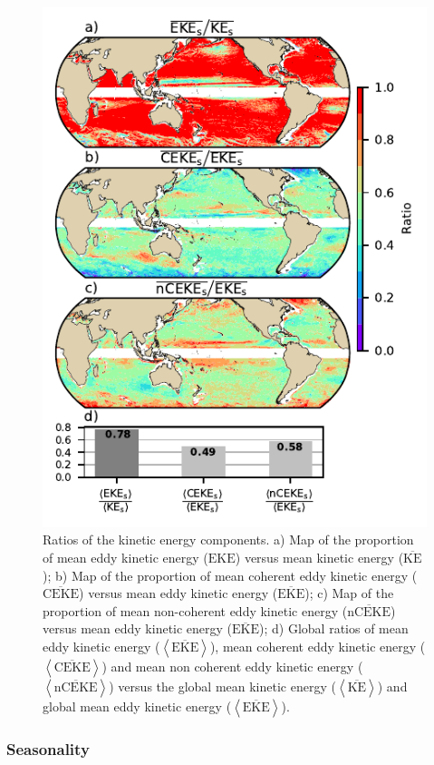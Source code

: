 \documentclass[draft,linenumbers]{agujournal2019}
\newcommand{\MKE}{\overline{\textrm{KE}}}
\newcommand{\MEKE}{\overline{\textrm{EKE}}}
\newcommand{\EKE}{\textrm{EKE}}
\newcommand{\MCEKE}{\overline{\textrm{CEKE}}}
\newcommand{\MnCEKE}{\overline{\textrm{nCEKE}}}
\begin{document}
	\begin{figure}
	    \centering
	    \includegraphics[width=1\textwidth]{figures/eke_ratio_map_easy.pdf}
	    \caption{Ratios of the kinetic energy components. a) Map of the proportion of mean eddy kinetic energy ($\EKE$) versus mean kinetic energy ($\MKE$);
		b) Map of the proportion of mean coherent eddy kinetic energy ($\MCEKE$) versus mean eddy kinetic energy ($\MEKE$);
		c) Map of the proportion of mean non-coherent eddy kinetic energy ($\MnCEKE$) versus mean eddy kinetic energy ($\MEKE$);
		d) Global ratios of mean eddy kinetic energy ($\left<\MEKE\right>$), mean coherent eddy kinetic energy ($\left<\MCEKE\right>$) and mean non coherent eddy kinetic energy ($\left<\MnCEKE\right>$) versus the global mean kinetic energy ($\left<\MKE\right>$) and global mean eddy kinetic energy ($\left<\MEKE\right>$).
		}
	    \label{fig:eddy_ratio}
	\end{figure}

	\subsubsection{Seasonality}
\end{document}
